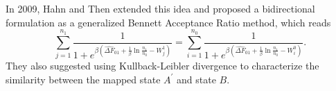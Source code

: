 In 2009, Hahn and Then extended this idea and proposed a bidirectional formulation as a generalized Bennett Acceptance Ratio method\cite{HahnPRE2009}, which reads
\begin{equation}
	\sum_{j=1}^{n_1}\frac{1}{1+e^{\beta\left(\widehat{\Delta F}_{01}+\frac{1}{\beta}\ln{\frac{n_1}{n_0}}-W_j^1\right)}}=	\sum_{i=1}^{n_0}\frac{1}{1+e^{\beta\left(\widehat{\Delta F}_{01}+\frac{1}{\beta}\ln{\frac{n_1}{n_0}}-W_i^0\right)}}.
\end{equation}
They also suggested using Kullback-Leibler divergence to characterize the similarity between the mapped state $A^\prime$ and state $B$.
